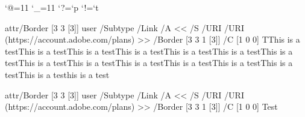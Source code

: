 \catcode`@=11
\catcode`_=11
\bgroup\lccode`?=`p \lccode`!=`t\lowercase{\egroup\def\@rmpt#1?!{#1}}
\def\@nopt#1{\expandafter\@rmpt\the\dimexpr#1\relax}
\def\nattrans,{.996264 0 0 .996264 0 0 cm}

\quitvmode\pdfstartlink attr{/Border [3 3 [3]]}
user {
    /Subtype /Link
    /A <<
        /S /URI
        /URI (https://account.adobe.com/plans)
    >>
    /Border [3 3 1 [3]]
    /C [1 0 0]
}%
TThis is a testThis is a testThis is a testThis is a testThis is a testThis is a testThis is a testThis is a testThis is a testThis is a testThis is a testThis is a testThis is a testThis is a testhis is a test
\pdfendlink

\quitvmode\pdfstartlink attr{/Border [3 3 [3]]}
user {
    /Subtype /Link
    /A <<
        /S /URI
        /URI (https://account.adobe.com/plans)
    >>
    /Border [3 3 1 [3]]
    /C [1 0 0]
}%
Test\pdfendlink

\bye

